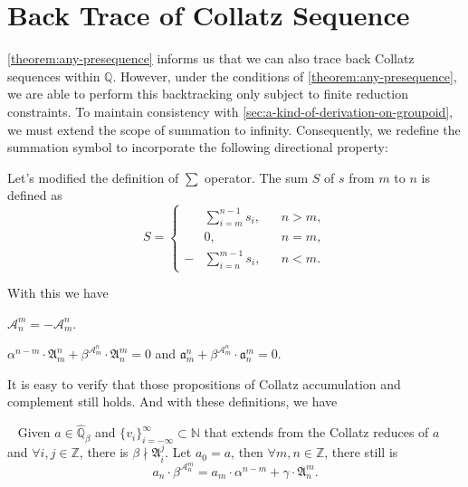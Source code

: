 \section{Back Trace of Collatz Sequence}\label{sec:back-trace-of-collatz-sequence}
\cref{theorem:any-presequence} informs us that we can also trace back Collatz sequences within $\mathbb{Q}$.
However, under the conditions of \cref{theorem:any-presequence}, we are able to perform this backtracking only subject to finite reduction constraints.
To maintain consistency with \cref{sec:a-kind-of-derivation-on-groupoid}, we must extend the scope of summation to infinity. Consequently, we redefine the summation symbol to incorporate the following directional property:
\begin{definition}
    Let's modified the definition of $\sum$ operator. The sum $S$ of $s$ from $m$ to $n$ is defined as
    \[ S = \left\{\begin{aligned}
    &\sum_{i=m}^{n-1}s_i, &&n > m, \\
    &0, &&n = m, \\
    -&\sum_{i=n}^{m-1}s_i, &&n < m.
\end{aligned}\right. \]
\end{definition}
With this we have
\begin{proposition}
    $\mathcal{A}_{n}^{m} = -\mathcal{A}_{m}^{n}$.
\end{proposition}
\begin{proposition}
    $\alpha^{n-m} \cdot \mathfrak{A}_{m}^{n} + \beta^{\mathcal{A}_m^n} \cdot \mathfrak{A}_{n}^{m} = 0$ and $\mathfrak{a}_{m}^{n} + \beta^{\mathcal{A}_m^n} \cdot \mathfrak{a}_{n}^{m} = 0$.
\end{proposition}
It is easy to verify that those propositions of Collatz accumulation and complement still holds.
And with these definitions, we have
\begin{theorem}~\label{theorem:final-inductive-formula}
Given $a \in \widehat{\mathbb{Q}}_{{\beta}}$ and $\{v_{i}\}_{i=-\infty}^{\infty} \subset \mathbb{N}$ that extends from the Collatz reduces of $a$ and $\forall i, j \in \mathbb{Z}$, there is $\beta \nmid \mathfrak{A}_{i}^{j}$.
Let $a_0 = a$, then $\forall m, n \in \mathbb{Z}$, there still is
\[ a_n \cdot \beta^{\mathcal{A}_{n}^{m}} = a_m \cdot\alpha^{n-m} + \gamma\cdot\mathfrak{A}_{n}^{m}. \]
\end{theorem}

